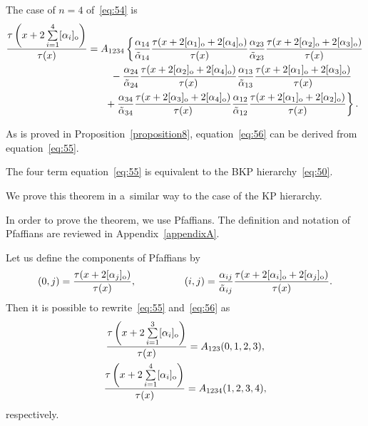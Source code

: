 \begin{example}
The case of $n=4$ of~\eqref{eq:54} is
\begin{gather}
\frac{\tau\left(x+2\sum\limits_{i=1}^{4}[\alpha_i]_{\rm o}\right)}{\tau(x)}
=A_{1234}\left\{\frac{\alpha_{14}}{\tilde{\alpha}_{14}}
\frac{\tau(x+2[\alpha_1]_{\rm o}+2[\alpha_4]_{\rm o})}{\tau(x)}\frac{\alpha_{23}}{\tilde{\alpha}_{23}}
\frac{\tau(x+2[\alpha_2]_{\rm o}+2[\alpha_3]_{\rm o})}{\tau(x)}\right.
\nonumber
\\
\hphantom{\frac{\tau\left(x+2\sum\limits_{i=1}^{4}[\alpha_i]_{\rm o}\right)}{\tau(x)}=}{}
-\frac{\alpha_{24}}{\tilde{\alpha}_{24}}\frac{\tau(x+2[\alpha_2]_{\rm o}+2[\alpha_4]_{\rm o})}{\tau(x)}
\frac{\alpha_{13}}{\tilde{\alpha}_{13}}\frac{\tau(x+2[\alpha_1]_{\rm o}+2[\alpha_3]_{\rm o})}{\tau(x)}\nonumber
\\
\left.
\hphantom{\frac{\tau\left(x+2\sum\limits_{i=1}^{4}[\alpha_i]_{\rm o}\right)}{\tau(x)}=}{}
+\frac{\alpha_{34}}{\tilde{\alpha}_{34}}\frac{\tau(x+2[\alpha_3]_{\rm o}+2[\alpha_4]_{\rm o})}{\tau(x)}\frac{\alpha_{12}
}{\tilde{\alpha}_{12}}\frac{\tau(x+2[\alpha_1]_{\rm o}+2[\alpha_2]_{\rm o})}{\tau(x)}\right\}.
\label{eq:56}
\end{gather}
\end{example}

 As is proved in Proposition~\ref{proposition8}, equation~\eqref{eq:56} can be derived from equation~\eqref{eq:55}.
\begin{theorem}\label{theorem3}
The four term equation~\eqref{eq:55} is equivalent to the BKP hierarchy~\eqref{eq:50}.
\end{theorem}

We prove this theorem in a~similar way to the case of the KP hierarchy.

In order to prove the theorem, we use Pfaf\/f\/ians.
The def\/inition and notation of Pfaf\/f\/ians are reviewed in Appendix~\ref{appendixA}.

Let us def\/ine the components of Pfaf\/f\/ians by
\begin{gather*}%
(0,j)=\frac{\tau(x+2[\alpha_j]_{\rm o})}{\tau(x)},\qquad \hskip1cm(i,j)=\frac{\alpha_{ij}}{\tilde{\alpha}_{ij}}
\frac{\tau(x+2[\alpha_i]_{\rm o}+2[\alpha_j]_{\rm o})}{\tau(x)}.
\end{gather*}
Then it is possible to rewrite~\eqref{eq:55} and~\eqref{eq:56} as
\begin{gather}
\frac{\tau\left(x+2\sum\limits_{i=1}^{3}[\alpha_i]_{\rm o}\right)}{\tau(x)}=A_{123}(0,1,2,3),
\label{eq:58}
\\
\frac{\tau\left(x+2\sum\limits_{i=1}^{4}[\alpha_i]_{\rm o}\right)}{\tau(x)}=A_{1234}(1,2,3,4),
\label{eq:59}
\end{gather}
respectively.

